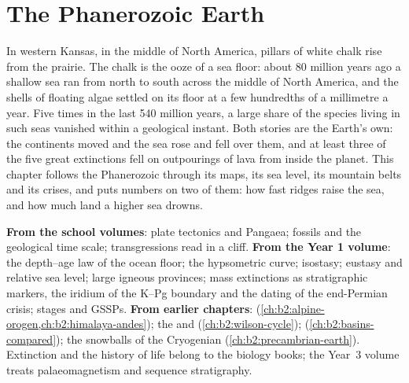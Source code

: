 \chapter{The Phanerozoic Earth}\label{ch:b2:phanerozoic-earth}

In western Kansas, in the middle of North America, pillars of white chalk rise from the
prairie. The chalk is the ooze of a sea floor: about 80 million years ago a
shallow sea ran from north to south across the middle of North America, and the shells of
floating algae settled on its floor at a few hundredths of a millimetre a year. Five times in the
last 540 million years, a large share of the species living in such seas vanished within a
geological instant. Both stories are the Earth's own: the continents moved and the sea rose and fell over
them, and at least three of the five great extinctions fell on outpourings of lava from inside
the planet. This chapter follows the Phanerozoic through its maps, its sea level, its mountain
belts and its crises, and puts numbers on two of them: how fast ridges raise the sea, and how much
land a higher sea drowns.

\begin{recall}
\textbf{From the school volumes}: plate tectonics and Pangaea; fossils and the geological time
scale; transgressions read in a cliff. \textbf{From the Year 1 volume}: the depth--age law of
the ocean floor; the hypsometric curve; isostasy; eustasy and relative sea level; large igneous
provinces; mass extinctions as stratigraphic markers, the iridium of the K--Pg boundary and the
dating of the end-Permian crisis; stages and GSSPs. \textbf{From earlier chapters}: 
(\cref{ch:b2:alpine-orogen,ch:b2:himalaya-andes}); the  and 
(\cref{ch:b2:wilson-cycle});  (\cref{ch:b2:basins-compared}); the snowballs of the
Cryogenian (\cref{ch:b2:precambrian-earth}). Extinction and the history of life belong to the
biology books; the Year~3 volume treats palaeomagnetism and sequence stratigraphy.
\end{recall}

